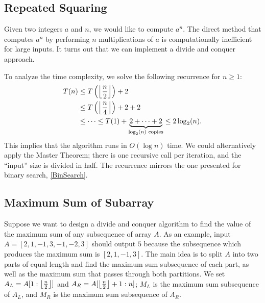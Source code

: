 \documentclass[11pt]{article}
\DeclarePairedDelimiter\floor{\lfloor}{\rfloor}
\begin{document}
\subsection{Repeated Squaring}
Given two integers $a$ and $n$, we would like to compute $a^n$. The direct method that computes $a^n$  by performing $n$ multiplications of $a$ is computationally inefficient for large inputs. It turns out that we can implement a divide and conquer approach. 

\IncMargin{2em}
\begin{algorithm}[H]
    \footnotesize
    \DontPrintSemicolon
    \BlankLine
\end{algorithm}\DecMargin{2em} 
To analyze the time complexity, we solve the following recurrence for $n \geq 1$:
\begin{align}
    \begin{split}
        T(n) &\leq T\left(\floor*{\frac{n}{2}}\right) + 2 \\
        &\leq T\left(\floor*{\frac{n}{4}}\right) + 2 + 2 \\
        &\leq \cdots \leq T(1) + \underbrace{2 + \cdots + 2}_{\log_2(n) \text{ copies}} \leq 2 \log_2(n).       
    \end{split}
\end{align}
This implies that the algorithm runs in $O(\log n)$ time. We could alternatively apply the Master Theorem; there is one recursive call per iteration, and the ``input'' size is divided in half. The recurrence mirrors the one presented for binary search, \cref{BinSearch}.

\subsection{Maximum Sum of Subarray}
Suppose we want to design a divide and conquer algorithm to find the value of the maximum sum of any subsequence of array $A$. As an example, input $A = [2, 1, -1, 3, -1, -2, 3]$ should output $5$ because the subsequence which produces the maximum sum is $[2, 1, -1, 3]$. The main idea is to split $A$ into two parts of equal length and find the maximum sum subsequence of each part, as well as the maximum sum that passes through both partitions. We set $A_L = A[1 : \floor*{\frac{n}{2}}]$ and $A_R = A[\floor*{\frac{n}{2}} + 1: n]$; $M_L$ is the maximum sum subsequence of $A_L$, and $M_R$ is the maximum sum subsequence of $A_R$. 
\end{document}

